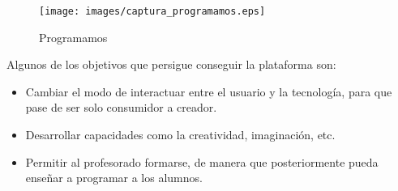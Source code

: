 \begin{figure}[!th]
\begin{center}
\texttt{[image: images/captura\_programamos.eps]}
\caption{Programamos}
\label{fig:3}
\end{center}
\end{figure}

Algunos de los objetivos que persigue conseguir la plataforma son:

\begin{itemize}
    \item Cambiar el modo de interactuar entre el usuario y la tecnología, para que pase de ser solo consumidor a creador.
    \item Desarrollar capacidades como la creatividad, imaginación, etc.
    \item Permitir al profesorado formarse, de manera que posteriormente pueda enseñar a programar a los alumnos.
\end{itemize}